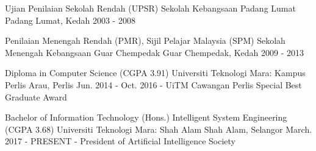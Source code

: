 

\begin{cventries}


\cventry
  {Ujian Penilaian Sekolah Rendah (UPSR)}
  {Sekolah Kebangsaan Padang Lumat}
  {Padang Lumat, Kedah}
  {2003 - 2008}
  {}

\cventry
  {Penilaian Menengah Rendah (PMR), Sijil Pelajar Malaysia (SPM)}
  {Sekolah Menengah Kebangsaan Guar Chempedak}
  {Guar Chempedak, Kedah}
  {2009 - 2013}
  {}

\cventry
  {Diploma in Computer Science (CGPA 3.91)}
  {Universiti Teknologi Mara: Kampus Perlis}
  {Arau, Perlis}
  {Jun. 2014 - Oct. 2016}
  {- UiTM Cawangan Perlis Special Best Graduate Award}

  \cventry
  {Bachelor of Information Technology (Hons.) Intelligent System Engineering (CGPA 3.68)}
  {Universiti Teknologi Mara: Shah Alam}
  {Shah Alam, Selangor}
  {March. 2017 - PRESENT}
  {- President of Artificial Intelligence Society}

\end{cventries}
